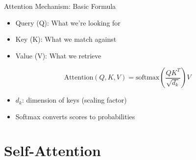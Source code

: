 \documentclass[serif, aspectratio=169]{beamer}
\begin{document}
\begin{frame}{Attention Mechanism: Basic Formula}
    \begin{itemize}
        \item Query (Q): What we're looking for
        \item Key (K): What we match against
        \item Value (V): What we retrieve
    \end{itemize}
    \begin{equation*}
        \text{Attention}(Q, K, V) = \text{softmax}\left(\frac{QK^T}{\sqrt{d_k}}\right)V
    \end{equation*}
    \begin{itemize}
        \item $d_k$: dimension of keys (scaling factor)
        \item Softmax converts scores to probabilities
    \end{itemize}
\end{frame}


\section{Self-Attention}
\end{document}
